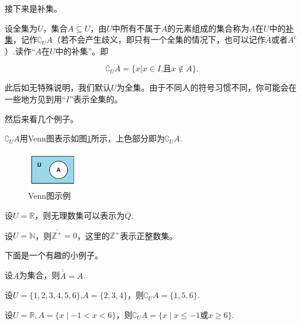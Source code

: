 \documentclass[lang=cn,math=cm,chinesefont=nofont,11pt,scheme=chinese,onecol]{elegantbook}
\begin{document}
  接下来是补集。
\begin{definition}
  设全集为$U$，集合$A\subseteq U$，由$U$中所有不属于$A$的元素组成的集合称为$A$在$U$中的\underline{补集}，记作${\complement}_{U}A$（若不会产生歧义，即只有一个全集的情况下，也可以记作$\overline{A}$或者$A^c$）.读作“$A$在$U$中的补集”。即

  $${\complement}_{U}A=\{x|x\in I\text{,且}x\notin A\}.$$
\end{definition}
\begin{remark}
  此后如无特殊说明，我们默认$U$为全集。由于不同人的符号习惯不同，你可能会在一些地方见到用“$I$”表示全集的。
\end{remark}
  然后来看几个例子。
\begin{example}
  $\complement_{U}A$用Venn图表示如图\ref{img:Venn3}所示，上色部分即为$\complement_{U}A$.
\end{example}
\begin{figure}[h]
  \centering
  \includegraphics[width=0.2\textwidth]{image/Venn3.png}
  \caption{Venn图示例}
  \label{img:Venn3}
\end{figure}

\begin{example}
  设$U=\mathbb{R}$，则无理数集可以表示为$\overline{Q}$.
\end{example}

\begin{example}
  设$U=\mathbb{N}$，则$\overline{\mathbb{Z}^+}={0}$，这里的$\mathbb{Z}^+$表示正整数集。
\end{example}

下面是一个有趣的小例子。

\begin{example}
  设$A$为集合，则$\overline{\overline{A}}=A$.
\end{example}

\begin{example}
  设$U=\{1,2,3,4,5,6\}$,$A=\{2,3,4\}$，则$\complement_{U}A=\{1,5,6\}.$
\end{example}

\begin{example}
  设$U=\mathbb{R},A=\{x\mid -1<x<6\}$，则$\complement_{U}A=\{x\mid x\leq -1\text{或}x\geq 6\}.$
\end{example}
\end{document}
